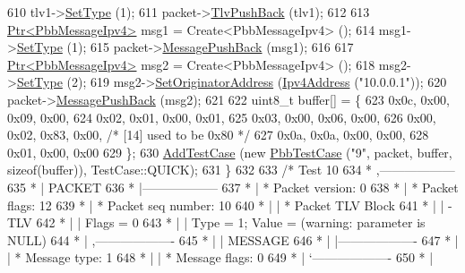 \begin{DoxyCode}
610     tlv1->\hyperlink{classns3_1_1PbbTlv_a90a0452018ed364ac37c3ad116dd718b}{SetType} (1);
611     packet->\hyperlink{classns3_1_1PbbPacket_a34935793e729a106c176db99c969cb42}{TlvPushBack} (tlv1);
612 
613     \hyperlink{classns3_1_1Ptr}{Ptr<PbbMessageIpv4>} msg1 = Create<PbbMessageIpv4> ();
614     msg1->\hyperlink{classns3_1_1PbbMessage_a4b3d1eaabd3e7412a46ac79bf3360dac}{SetType} (1);
615     packet->\hyperlink{classns3_1_1PbbPacket_a4a3170001ef758d9c9c4375b8f089826}{MessagePushBack} (msg1);
616 
617     \hyperlink{classns3_1_1Ptr}{Ptr<PbbMessageIpv4>} msg2 = Create<PbbMessageIpv4> ();
618     msg2->\hyperlink{classns3_1_1PbbMessage_a4b3d1eaabd3e7412a46ac79bf3360dac}{SetType} (2);
619     msg2->\hyperlink{classns3_1_1PbbMessage_a52ac135a2bec53db5e8f46b8b8a25e7c}{SetOriginatorAddress} (\hyperlink{classns3_1_1Ipv4Address}{Ipv4Address} (\textcolor{stringliteral}{"10.0.0.1"}));
620     packet->\hyperlink{classns3_1_1PbbPacket_a4a3170001ef758d9c9c4375b8f089826}{MessagePushBack} (msg2);
621 
622     uint8\_t buffer[] = \{
623       0x0c, 0x00, 0x09, 0x00,
624       0x02, 0x01, 0x00, 0x01,
625       0x03, 0x00, 0x06, 0x00,
626       0x00, 0x02, 0x83, 0x00,   \textcolor{comment}{/* [14] used to be 0x80 */}
627       0x0a, 0x0a, 0x00, 0x00,
628       0x01, 0x00, 0x00
629     \};
630     \hyperlink{classns3_1_1TestCase_a3718088e3eefd5d6454569d2e0ddd835}{AddTestCase} (\textcolor{keyword}{new} \hyperlink{classPbbTestCase}{PbbTestCase} (\textcolor{stringliteral}{"9"}, packet, buffer, \textcolor{keyword}{sizeof}(buffer)), 
      TestCase::QUICK);
631   \}
632 
633   \textcolor{comment}{/* Test 10}
634 \textcolor{comment}{         * ,------------------}
635 \textcolor{comment}{         * |  PACKET}
636 \textcolor{comment}{         * |------------------}
637 \textcolor{comment}{         * | * Packet version:    0}
638 \textcolor{comment}{         * | * Packet flags:  12}
639 \textcolor{comment}{         * | * Packet seq number: 10}
640 \textcolor{comment}{         * |    | * Packet TLV Block}
641 \textcolor{comment}{         * |    |     - TLV}
642 \textcolor{comment}{         * |    |         Flags = 0}
643 \textcolor{comment}{         * |    |         Type = 1; Value = (warning: parameter is NULL)}
644 \textcolor{comment}{         * |    ,-------------------}
645 \textcolor{comment}{         * |    |  MESSAGE}
646 \textcolor{comment}{         * |    |-------------------}
647 \textcolor{comment}{         * |    | * Message type:       1}
648 \textcolor{comment}{         * |    | * Message flags:  0}
649 \textcolor{comment}{         * |    `-------------------}
650 \textcolor{comment}{         * |}

\end{DoxyCode}
